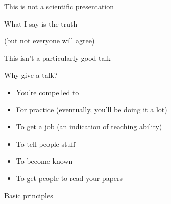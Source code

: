 \documentclass[12pt]{article}
\newcommand{\headsize}{\fontsize{35}{35} \selectfont}
\newcommand{\textsize}{\fontsize{30}{35} \selectfont}
\newcommand{\smallsize}{\fontsize{25}{30} \selectfont}
\newcommand{\smallersize}{\fontsize{20}{25} \selectfont}
\begin{document}
\vspace{6cm} \color{mywhite} \textsize

\centerline{This is {\color{mypink} not} a scientific presentation}

\vspace{3cm}

\centerline{What I say is the {\color{mypink} truth}}

\centerline{\color{myblue} \smallersize (but not everyone will agree)}

\vspace{3cm}

\centerline{This isn't a particularly good talk}



\newpage

\headsize \color{myyellow}
\hfill \begin{minipage}{5.75in}
\centering
Why give a talk?
\end{minipage}

\vspace{3cm} \color{mywhite} \smallsize

\hfill \begin{minipage}{9.5in}

\begin{itemize}
\itemsep24pt
\item You're compelled to

\item For practice {\color{myblue} \smallersize (eventually, you'll be doing it a lot)}

\item To get a job {\color{myblue} \smallersize (an indication of
    teaching ability)}

\item To tell people stuff

\item To become known

\item To get people to read your papers

\end{itemize}

\end{minipage}





\newpage

\headsize \color{myyellow}
\hfill \begin{minipage}{5.75in}
\centering
Basic principles
\end{minipage}
\end{document}
